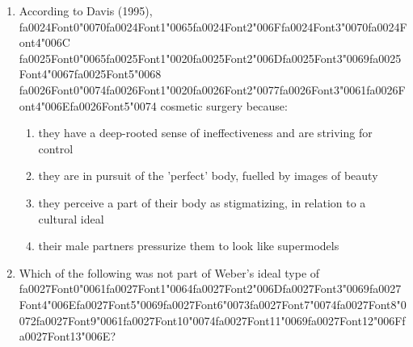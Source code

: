 \documentclass[12pt]{article}
\begin{document}
\begin{enumerate}[label=\arabic*.]
\begin{enumerate}[label=(\alph*)]
    \item the product they were making
    \item the production process
    \item each other and humanity in general
    \item all of the above
\end{enumerate}
\item According to Davis (1995), {\csname fa0024Font0\endcsname\char"0070}{\csname fa0024Font1\endcsname\char"0065}{\csname fa0024Font2\endcsname\char"006F}{\csname fa0024Font3\endcsname\char"0070}{\csname fa0024Font4\endcsname\char"006C} {\csname fa0025Font0\endcsname\char"0065}{\csname fa0025Font1\endcsname\char"0020}{\csname fa0025Font2\endcsname\char"006D}{\csname fa0025Font3\endcsname\char"0069}{\csname fa0025Font4\endcsname\char"0067}{\csname fa0025Font5\endcsname\char"0068} {\csname fa0026Font0\endcsname\char"0074}{\csname fa0026Font1\endcsname\char"0020}{\csname fa0026Font2\endcsname\char"0077}{\csname fa0026Font3\endcsname\char"0061}{\csname fa0026Font4\endcsname\char"006E}{\csname fa0026Font5\endcsname\char"0074} cosmetic surgery because:
\begin{enumerate}[label=(\alph*)]
    \item they have a deep-rooted sense of ineffectiveness and are striving for control
    \item they are in pursuit of the 'perfect' body, fuelled by images of beauty
    \item they perceive a part of their body as stigmatizing, in relation to a cultural ideal
    \item their male partners pressurize them to look like supermodels
\end{enumerate}
\item Which of the following was not part of Weber's ideal type of {\csname fa0027Font0\endcsname\char"0061}{\csname fa0027Font1\endcsname\char"0064}{\csname fa0027Font2\endcsname\char"006D}{\csname fa0027Font3\endcsname\char"0069}{\csname fa0027Font4\endcsname\char"006E}{\csname fa0027Font5\endcsname\char"0069}{\csname fa0027Font6\endcsname\char"0073}{\csname fa0027Font7\endcsname\char"0074}{\csname fa0027Font8\endcsname\char"0072}{\csname fa0027Font9\endcsname\char"0061}{\csname fa0027Font10\endcsname\char"0074}{\csname fa0027Font11\endcsname\char"0069}{\csname fa0027Font12\endcsname\char"006F}{\csname fa0027Font13\endcsname\char"006E}?
\begin{enumerate}[label=(\alph*)]

\end{enumerate}
\end{enumerate}
\end{document}
